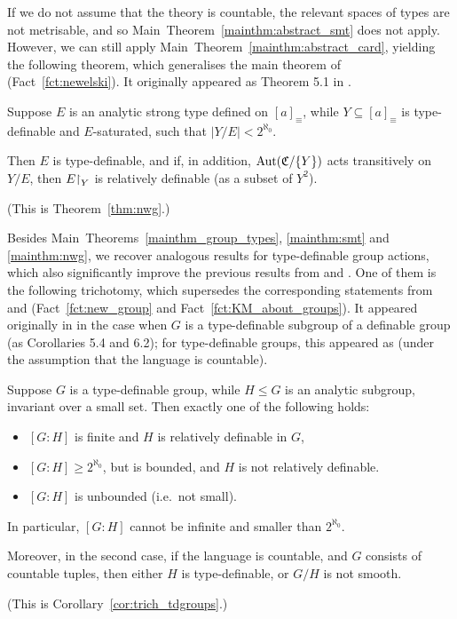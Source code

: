 	If we do not assume that the theory is countable, the relevant spaces of types are not metrisable, and so Main~Theorem~\ref{mainthm:abstract_smt} does not apply. However, we can still apply Main~Theorem~\ref{mainthm:abstract_card}, yielding the following theorem, which generalises the main theorem of \cite{Ne03} (Fact~\ref{fct:newelski}). It originally appeared as Theorem 5.1 in \cite{KPR15}.
	\begin{mainthm}
		\label{mainthm:nwg}
		Suppose $E$ is an analytic strong type defined on $[a]_{\equiv}$, while $Y\subseteq [a]_{\equiv}$ is type-definable and $E$-saturated, such that $\lvert Y/E\rvert<2^{\aleph_0}$.
		
		Then $E$ is type-definable, and if, in addition, $\operatorname{{Aut}}({\mathfrak C}/\{Y\})$ acts transitively on $Y/E$, then $E\mathord{\upharpoonright}_Y$ is relatively definable (as a subset of $Y^2$).
	\end{mainthm}
	(This is Theorem~\ref{thm:nwg}.)
	
	Besides Main~Theorems~\ref{mainthm_group_types}, \ref{mainthm:smt} and \ref{mainthm:nwg}, we recover analogous results for type-definable group actions, which also significantly improve the previous results from \cite{KM14} and \cite{KR16}. One of them is the following trichotomy, which supersedes the corresponding statements from \cite{Ne03} and \cite{KM14} (Fact~\ref{fct:new_group} and Fact~\ref{fct:KM_about_groups}). It appeared originally in \cite{KPR15} in the case when $G$ is a type-definable subgroup of a definable group (as Corollaries 5.4 and 6.2); for type-definable groups, this appeared as \cite[Corollary 8.6]{KR18} (under the assumption that the language is countable).
	\begin{mainthm}
		\label{mainthm:tdgroup}
		Suppose $G$ is a type-definable group, while $H\leq G$ is an analytic subgroup, invariant over a small set. Then exactly one of the following holds:
		\begin{itemize}
			\item
			$[G:H]$ is finite and $H$ is relatively definable in $G$,
			\item
			$[G:H]\geq 2^{\aleph_0}$, but is bounded, and $H$ is not relatively definable.
			\item
			$[G:H]$ is unbounded (i.e.\ not small).
		\end{itemize}
		In particular, $[G:H]$ cannot be infinite and smaller than $2^{\aleph_0}$.
		
		Moreover, in the second case, if the language is countable, and $G$ consists of countable tuples, then either $H$ is type-definable, or $G/H$ is not smooth.
	\end{mainthm}
	(This is Corollary~\ref{cor:trich_tdgroups}.)
	
